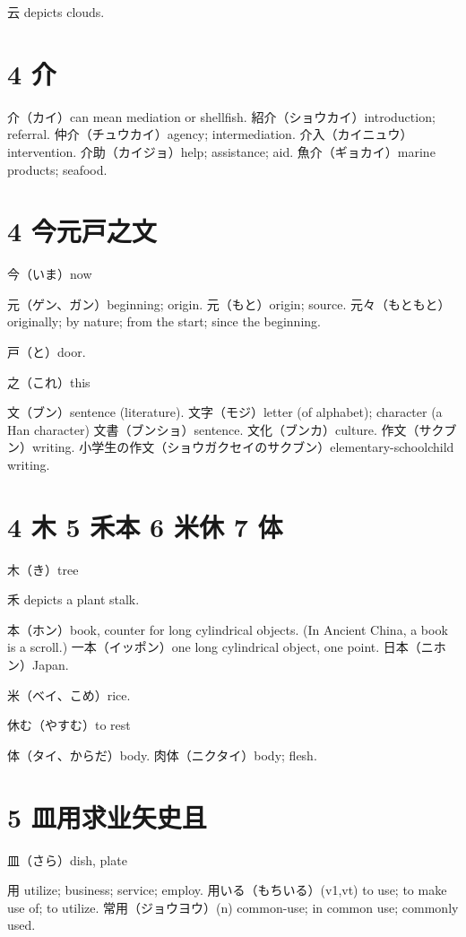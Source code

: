 云 depicts clouds.

\section{4 介}

介（カイ）can mean mediation or shellfish.
紹介（ショウカイ）introduction; referral.
仲介（チュウカイ）agency; intermediation.
介入（カイニュウ）intervention.
介助（カイジョ）help; assistance; aid.
魚介（ギョカイ）marine products; seafood.

\section{4 今元戸之文}

今（いま）now

元（ゲン、ガン）beginning; origin.
元（もと）origin; source.
元々（もともと）
originally; by nature; from the start; since the beginning.

戸（と）door.

之（これ）this

文（ブン）sentence (literature).
文字（モジ）letter (of alphabet); character (a Han character)
文書（ブンショ）sentence.
文化（ブンカ）culture.
作文（サクブン）writing.
小学生の作文（ショウガクセイのサクブン）elementary-schoolchild writing.

\section{4 木 5 禾本 6 米休 7 体}

木（き）tree

禾 depicts a plant stalk.

本（ホン）book, counter for long cylindrical objects.
(In Ancient China, a book is a scroll.)
一本（イッポン）one long cylindrical object, one point.
日本（ニホン）Japan.

米（ベイ、こめ）rice.

休む（やすむ）to rest

体（タイ、からだ）body.
肉体（ニクタイ）body; flesh.

\section{5 皿用求业矢史且}

皿（さら）dish, plate

用 utilize; business; service; employ.
用いる（もちいる）(v1,vt) to use; to make use of; to utilize.
常用（ジョウヨウ）(n) common-use; in common use; commonly used.

